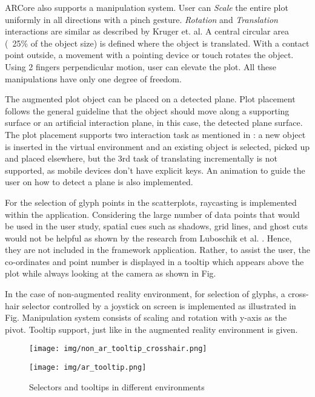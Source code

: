 \documentclass[journal]{vgtc}                %
\begin{document}
ARCore also supports a manipulation system. User can  \textit{Scale} the entire plot uniformly in all directions with a pinch gesture. \textit{Rotation} and \textit{Translation} interactions are similar as described by Kruger et. al\cite{Kruger2005}. A central circular area (~25\% of the object size) is defined where the object is translated. With a contact point outside, a movement with a pointing device or touch rotates the object. Using 2 fingers perpendicular motion, user can elevate the plot. All these manipulations have only one degree of freedom.

The augmented plot object can be placed on a detected plane. Plot placement follows the general guideline that the object should move along a supporting surface or an artificial interaction plane, in this case, the detected plane surface. The plot placement supports two interaction task as mentioned in \cite{Teather2007}: a new object is inserted in the virtual environment and an existing object is selected, picked up and placed elsewhere, but the 3rd task of translating incrementally is not supported, as mobile devices don’t have explicit keys. An animation to guide the user on how to detect a plane is also implemented.

For the selection of glyph points in the scatterplots, raycasting is implemented within the application. Considering the large number of data points that would be used in the user study, spatial cues such as shadows, grid lines, and ghost cuts would not be helpful as shown by the research from Luboschik et al. \cite{luboschik2016spatial}. Hence, they are not included in the framework application. Rather, to assist the user, the co-ordinates and point number is displayed in a tooltip which appears above the plot while always looking at the camera as shown in Fig.

In the case of non-augmented reality environment, for selection of glyphs, a cross-hair selector controlled by a joystick on screen is implemented as illustrated in Fig. Manipulation system consists of scaling and rotation with y-axis as the pivot. Tooltip support, just like in the augmented reality environment is given.  

\begin{figure}[ht]
    \begin{minipage}[b]{0.45\linewidth}
        \centering
        \texttt{[image: img/non\_ar\_tooltip\_crosshair.png]}
    \end{minipage}
    \hspace{0.5cm}
    \begin{minipage}[b]{0.45\linewidth}
        \centering
        \texttt{[image: img/ar\_tooltip.png]}
    \end{minipage}
    \caption{Selectors and tooltips in different environments}
\end{figure}
\end{document}
